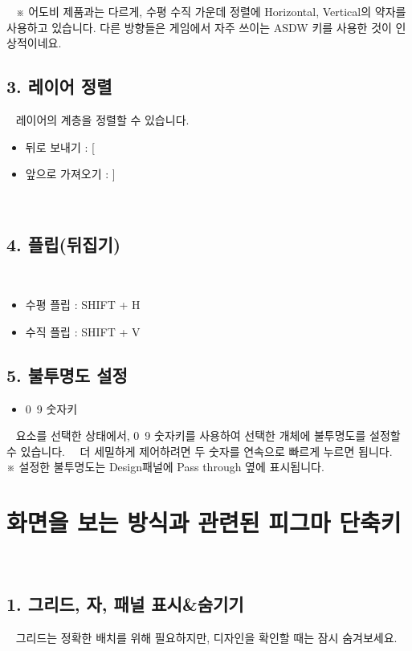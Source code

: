 \documentclass[12pt, a4paper, oneside]{book}
\begin{document}
 
※ 어도비 제품과는 다르게, 수평 수직 가운데 정렬에 Horizontal, Vertical의 약자를 사용하고 있습니다. 
다른 방향들은 게임에서 자주 쓰이는 ASDW 키를 사용한 것이 인상적이네요.

	\subsection{3. 레이어 정렬}
 
레이어의 계층을 정렬할 수 있습니다.
 

			\begin{itemize}[topsep=0.0em, parsep=0.0em, itemsep=0em, leftmargin=6.0em, labelwidth=3em, labelsep=1em] 
			\item 	뒤로 보내기 : [
			\item 	앞으로 가져오기 : ]
			\end{itemize}


 
 
	\subsection{4. 플립(뒤집기)}
 

			\begin{itemize}[topsep=0.0em, parsep=0.0em, itemsep=0em, leftmargin=6.0em, labelwidth=3em, labelsep=1em] 
			\item 	수평 플립 : SHIFT + H
			\item 	수직 플립 : SHIFT + V
			\end{itemize}



	\subsection{5. 불투명도 설정}

			\begin{itemize}[topsep=0.0em, parsep=0.0em, itemsep=0em, leftmargin=6.0em, labelwidth=3em, labelsep=1em] 
			\item 	0~9 숫자키
			\end{itemize}
 
요소를 선택한 상태에서, 0~9 숫자키를 사용하여 선택한 개체에 불투명도를 설정할 수 있습니다.  
더 세밀하게 제어하려면 두 숫자를 연속으로 빠르게 누르면 됩니다.\\
※ 설정한 불투명도는 Design패널에 Pass through 옆에 표시됩니다.



	\section{화면을 보는 방식과 관련된 피그마 단축키}
 
	\subsection{1. 그리드, 자, 패널 표시\&숨기기}
 
그리드는 정확한 배치를 위해 필요하지만, 디자인을 확인할 때는 잠시 숨겨보세요.
 
\end{document}
